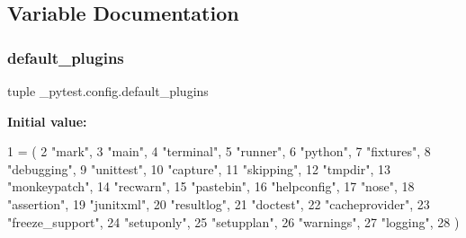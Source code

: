 \subsection{Variable Documentation}
\mbox{\label{namespace__pytest_1_1config_aa674b255ec7869901e28721600f3ca76}} 
\subsubsection{\texorpdfstring{default\+\_\+plugins}{default\_plugins}}
{\footnotesize\ttfamily tuple \+\_\+pytest.\+config.\+default\+\_\+plugins}

{\bfseries Initial value\+:}
\begin{DoxyCode}
1 =  (
2     \textcolor{stringliteral}{"mark"},
3     \textcolor{stringliteral}{"main"},
4     \textcolor{stringliteral}{"terminal"},
5     \textcolor{stringliteral}{"runner"},
6     \textcolor{stringliteral}{"python"},
7     \textcolor{stringliteral}{"fixtures"},
8     \textcolor{stringliteral}{"debugging"},
9     \textcolor{stringliteral}{"unittest"},
10     \textcolor{stringliteral}{"capture"},
11     \textcolor{stringliteral}{"skipping"},
12     \textcolor{stringliteral}{"tmpdir"},
13     \textcolor{stringliteral}{"monkeypatch"},
14     \textcolor{stringliteral}{"recwarn"},
15     \textcolor{stringliteral}{"pastebin"},
16     \textcolor{stringliteral}{"helpconfig"},
17     \textcolor{stringliteral}{"nose"},
18     \textcolor{stringliteral}{"assertion"},
19     \textcolor{stringliteral}{"junitxml"},
20     \textcolor{stringliteral}{"resultlog"},
21     \textcolor{stringliteral}{"doctest"},
22     \textcolor{stringliteral}{"cacheprovider"},
23     \textcolor{stringliteral}{"freeze\_support"},
24     \textcolor{stringliteral}{"setuponly"},
25     \textcolor{stringliteral}{"setupplan"},
26     \textcolor{stringliteral}{"warnings"},
27     \textcolor{stringliteral}{"logging"},
28 )
\end{DoxyCode}
